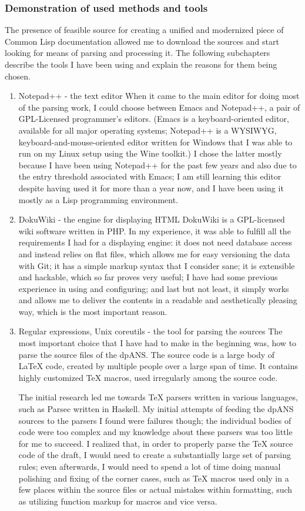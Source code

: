 \documentclass[11pt]{article}
\begin{document}
\subsubsection{Demonstration of used methods and tools}
\label{sec:org0ec89c1}
The presence of feasible source for creating a unified and modernized piece of Common Lisp documentation allowed me to download the sources and start looking for means of parsing and processing it. The following subchapters describe the tools I have been using and explain the reasons for them being chosen.
\begin{enumerate}
\item Notepad++ - the text editor
\label{sec:org7ff2896}
When it came to the main editor for doing most of the parsing work, I could choose between Emacs and Notepad++, a pair of GPL-Licensed programmer's editors. (Emacs is a keyboard-oriented editor, available for all major operating systems; Notepad++ is a WYSIWYG, keyboard-and-mouse-oriented editor written for Windows that I was able to run on my Linux setup using the Wine toolkit.) I chose the latter mostly because I have been using Notepad++ for the past few years and also due to the entry threshold associated with Emacs; I am still learning this editor despite having used it for more than a year now, and I have been using it mostly as a Lisp programming environment.
\item DokuWiki - the engine for displaying HTML
\label{sec:orga4822e5}
DokuWiki is a GPL-licensed wiki software written in PHP. In my experience, it was able to fulfill all the requirements I had for a displaying engine: it does not need database access and instead relies on flat files, which allows me for easy versioning the data with Git; it has a simple markup syntax that I consider sane; it is extensible and hackable, which so far proves very useful; I have had some previous experience in using and configuring; and last but not least, it simply works and allows me to deliver the contents in a readable and aesthetically pleasing way, which is the most important reason.
\item Regular expressions, Unix coreutils - the tool for parsing the sources
\label{sec:org420f966}
The most important choice that I have had to make in the beginning was, how to parse the source files of the dpANS. The source code is a large body of \LaTeX{} code, created by multiple people over a large span of time. It contains highly customized \TeX{} macros, used irregularly among the source code.

The initial research led me towards \TeX{} parsers written in various languages, such as Parsec written in Haskell. My initial attempts of feeding the dpANS sources to the parsers I found were failures though; the individual bodies of code were too complex and my knowledge about these parsers was too little for me to succeed. I realized that, in order to properly parse the \TeX{} source code of the draft, I would need to create a substantially large set of parsing rules; even afterwards, I would need to spend a lot of time doing manual polishing and fixing of the corner cases, such as \TeX{} macros used only in a few places within the source files or actual mistakes within formatting, such as utilizing function markup for macros and vice versa.


\end{enumerate}
\end{document}
